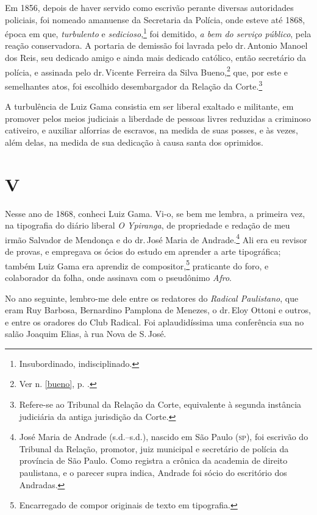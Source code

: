 Em 1856, depois de haver servido como escrivão perante diversas
autoridades policiais, foi nomeado amanuense da Secretaria da Polícia,
onde esteve até 1868, época em que, \emph{turbulento} e
\emph{sedicioso},\footnote{Insubordinado, indisciplinado.} foi
demitido, \emph{a bem do serviço público}, pela reação conservadora. A
portaria de demissão foi lavrada pelo dr.\,Antonio Manoel dos Reis, seu
dedicado amigo e ainda mais dedicado católico, então secretário da
polícia, e assinada pelo dr.\,Vicente Ferreira da Silva Bueno,\footnote{
  Ver n. \ref{bueno}, p. \pageref{bueno}.} que, por este e
semelhantes atos, foi escolhido desembargador da Relação da
Corte.\footnote{Refere-se ao Tribunal da Relação da Corte, equivalente
  à segunda instância judiciária da antiga jurisdição da Corte.}

A turbulência de Luiz Gama consistia em ser liberal exaltado e
militante, em promover pelos meios judiciais a liberdade de pessoas
livres reduzidas a criminoso cativeiro, e auxiliar alforrias de
escravos, na medida de suas posses, e às vezes, além delas, na medida de
sua dedicação à causa santa dos oprimidos.

\section*{V}

Nesse ano de 1868, conheci Luiz Gama. Vi-o, se bem me lembra, a primeira
vez, na tipografia do diário liberal \emph{O Ypiranga}, de propriedade e
redação de meu irmão Salvador de Mendonça e do dr.\,José Maria de
Andrade.\footnote{José Maria de Andrade (s.d.--s.d.), nascido em São %
  Paulo (\textsc{sp}), foi escrivão do Tribunal da Relação, promotor, juiz
  municipal e secretário de polícia da província de São Paulo. Como
  registra a crônica da academia de direito paulistana, e o parecer
  supra indica, Andrade foi sócio do escritório dos Andradas.} Ali era
eu revisor de provas, e empregava os ócios do estudo em aprender a arte
tipográfica; também Luiz Gama era aprendiz de compositor,\footnote{
  Encarregado de compor originais de texto em tipografia.} praticante
do foro, e colaborador da folha, onde assinava com o pseudônimo
\emph{Afro}.

No ano seguinte, lembro-me dele entre os redatores do \emph{Radical
Paulistano}, que eram Ruy Barbosa, Bernardino Pamplona de Menezes, o dr.\,Eloy Ottoni e outros, e entre os oradores do Club Radical. Foi
aplaudidíssima uma conferência sua no salão Joaquim Elias, à rua Nova de
S.\,José.

